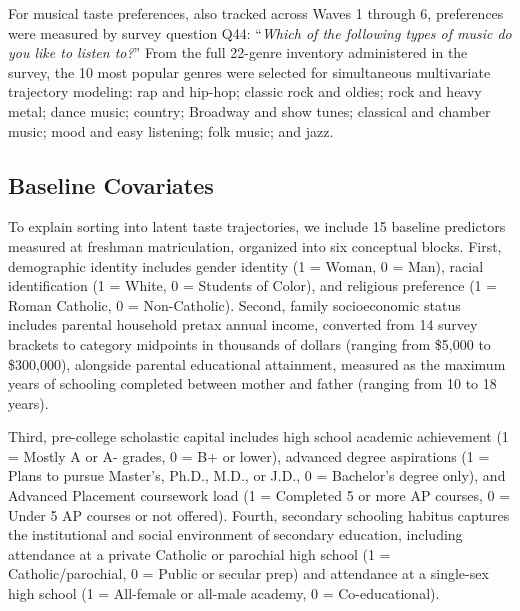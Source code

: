 \documentclass[12pt]{article}
\begin{document}
For musical taste preferences, also tracked across Waves 1 through 6, preferences were measured by survey question Q44: ``\textit{Which of the following types of music do you like to listen to?}'' From the full 22-genre inventory administered in the survey, the 10 most popular genres were selected for simultaneous multivariate trajectory modeling: rap and hip-hop; classic rock and oldies; rock and heavy metal; dance music; country; Broadway and show tunes; classical and chamber music; mood and easy listening; folk music; and jazz.

\subsection{Baseline Covariates}

To explain sorting into latent taste trajectories, we include 15 baseline predictors measured at freshman matriculation, organized into six conceptual blocks. First, demographic identity includes gender identity (1 = Woman, 0 = Man), racial identification (1 = White, 0 = Students of Color), and religious preference (1 = Roman Catholic, 0 = Non-Catholic). Second, family socioeconomic status includes parental household pretax annual income, converted from 14 survey brackets to category midpoints in thousands of dollars (ranging from \$5,000 to \$300,000), alongside parental educational attainment, measured as the maximum years of schooling completed between mother and father (ranging from 10 to 18 years).

Third, pre-college scholastic capital includes high school academic achievement (1 = Mostly A or A- grades, 0 = B+ or lower), advanced degree aspirations (1 = Plans to pursue Master's, Ph.D., M.D., or J.D., 0 = Bachelor's degree only), and Advanced Placement coursework load (1 = Completed 5 or more AP courses, 0 = Under 5 AP courses or not offered). Fourth, secondary schooling habitus captures the institutional and social environment of secondary education, including attendance at a private Catholic or parochial high school (1 = Catholic/parochial, 0 = Public or secular prep) and attendance at a single-sex high school (1 = All-female or all-male academy, 0 = Co-educational).
\end{document}
